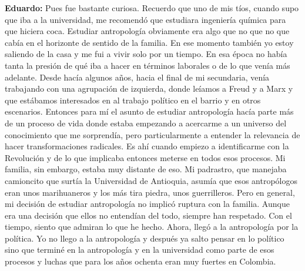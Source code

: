 \documentclass[
]{interact}
\begin{document}
\textbf{Eduardo:} Pues fue bastante curiosa. Recuerdo que uno de mis
tíos, cuando supo que iba a la universidad, me recomendó que estudiara
ingeniería química para que hiciera coca. Estudiar antropología
obviamente era algo que no que no que cabía en el horizonte de sentido
de la familia. En ese momento también yo estoy saliendo de la casa y me
fui a vivir solo por un tiempo. En esa época no había tanta la presión
de qué iba a hacer en términos laborales o de lo que venía más adelante.
Desde hacía algunos años, hacia el final de mi secundaria, venía
trabajando con una agrupación de izquierda, donde leíamos a Freud y a
Marx y que estábamos interesados en al trabajo político en el barrio y
en otros escenarios. Entonces para mí el asunto de estudiar antropología
hacía parte más de un proceso de vida donde estaba empezando a acercarme
a un universo del conocimiento que me sorprendía, pero particularmente a
entender la relevancia de hacer transformaciones radicales. Es ahí
cuando empiezo a identificarme con la Revolución y de lo que implicaba
entonces meterse en todos esos procesos. Mi familia, sin embargo, estaba
muy distante de eso. Mi padrastro, que manejaba camioncito que surtía la
Universidad de Antioquia, asumía que esos antropólogos eran unos
marihuaneros y los más tira piedra, unos guerrilleros. Pero en general,
mi decisión de estudiar antropología no implicó ruptura con la familia.
Aunque era una decisión que ellos no entendían del todo, siempre han
respetado. Con el tiempo, siento que admiran lo que he hecho. Ahora,
llegó a la antropología por la política. Yo no llego a la antropología y
después ya salto pensar en lo político sino que terminé en la
antropología y en la universidad como parte de esos procesos y luchas
que para los años ochenta eran muy fuertes en Colombia.
\end{document}
